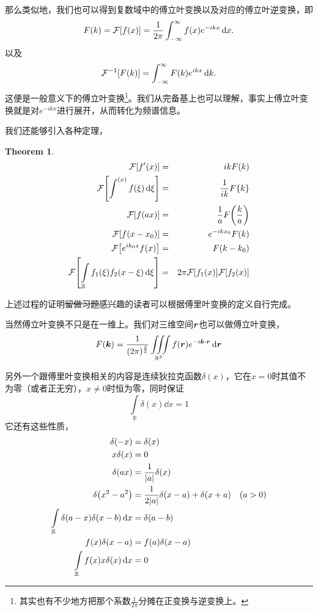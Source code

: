 \documentclass[12pt,a4paper,openany,twoside]{book}
\newtheorem{theorem}{Theorem}[section]
\numberwithin{equation}{section}
\begin{document}
    那么类似地，我们也可以得到复数域中的傅立叶变换以及对应的傅立叶逆变换，即
    \begin{equation}
      F\qty(k)=\mathcal{F}\qty[f\qty(x)]=\frac{1}{2\pi}\int_{-\infty}^{\infty}{f\qty(x)e^{-ikx}\dd{x}} 
      .
    \end{equation}
    以及
    \begin{equation}
      \mathcal{F}^{-1}\qty[F\qty(k)]=\int_{-\infty}^\infty{F\qty(k)e^{ikx}\dd{k}}
      .
    \end{equation}
    这便是一般意义下的傅立叶变换\footnote{其实也有不少地方把那个系数$\frac{1}{2\pi}$分摊在正变换与逆变换上。}。我们从完备基上也可以理解，事实上傅立叶变换就是对$e^{-ikx}$进行展开，从而转化为频谱信息。

    我们还能够引入各种定理，
    \begin{theorem}
      \begin{align}
        \mathcal{F}\qty[f'\qty(x)]&=&ikF\qty(k)\\
        \mathcal{F}\qty[\int^\qty(x){f\qty(\xi)\dd{\xi}}]&=&\frac{1}{ik}F\qty{k}\\
        \mathcal{F}\qty[f\qty(ax)]&=&\frac{1}{a}F\qty(\frac{k}{a})\\
        \mathcal{F}\qty[f\qty(x-x_0)]&=&e^{-ikx_0}F\qty(k)\\
        \mathcal{F}\qty[e^{ik_0x}f\qty(x)]&=&F\qty(k-k_0)\\
        \mathcal{F}\qty[\int\limits_\mathbb{R}{f_1\qty(\xi)f_2\qty(x-\xi)\dd{\xi}}]&=&2\pi\mathcal{F}\qty[f_1\qty(x)]\mathcal{F}\qty[f_2\qty(x)]
      \end{align}
    \end{theorem}
    上述过程的证明\sout{留做习题}感兴趣的读者可以根据傅里叶变换的定义自行完成。

    当然傅立叶变换不只是在一维上。我们对三维空间$\vb*{r}$也可以做傅立叶变换，
    \begin{equation}
      F(\vb*{k})=\frac{1}{(2\pi)^{\frac{3}{2}}}\iiint\limits_{\mathbb{R}^3}{f(\vb*{r})e^{-i\vb*{k}\cdot\vb*{r}}\dd{\vb*{r}}}
    \end{equation}

    另外一个跟傅里叶变换相关的内容是连续狄拉克函数$\delta(x)$，它在$x=0$时其值不为零（或者正无穷），$x\neq 0$时恒为零，同时保证
    \begin{equation}
      \int\limits_\mathbb{R}{\delta(x)\dd{x}}=1
    \end{equation}
    它还有这些性质，
    \begin{align}
      \delta\qty(-x)&=\delta\qty(x)\\
      x\delta\qty(x)&=0\\
      \delta\qty(ax)&=\frac{1}{\abs{a}}\delta\qty(x)\\
      \delta\qty(x^2-a^2)&=\frac{1}{2\abs{a}}{\delta\qty(x-a)+\delta\qty(x+a)}\quad\qty(a>0)\\
      \int\limits_\mathbb{R}{\delta\qty(a-x)\delta\qty(x-b)\dd{x}}&=\delta\qty(a-b)\\
      f\qty(x)\delta\qty(x-a)&=f\qty(a)\delta\qty(x-a)\\
      \int\limits_\mathbb{R}{f\qty(x)x\delta\qty(x)\dd{x}}&=0
    \end{align}
\end{document}
